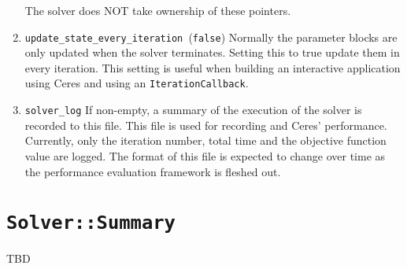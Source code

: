 \begin{enumerate}
The solver does NOT take ownership of these pointers.

\item{\texttt{update\_state\_every\_iteration }}(\texttt{false})
Normally the parameter blocks are only updated when the solver
terminates. Setting this to true update them in every iteration. This
setting is useful when building an interactive application using Ceres
and using an \texttt{IterationCallback}.

\item{\texttt{solver\_log}}  If non-empty, a summary of the execution of the solver is
 recorded to this file.  This file is used for recording and Ceres'
 performance. Currently, only the iteration number, total
 time and the objective function value are logged. The format of this
 file is expected to change over time as the performance evaluation
 framework is fleshed out.
\end{enumerate}

\section{\texttt{Solver::Summary}}
TBD
